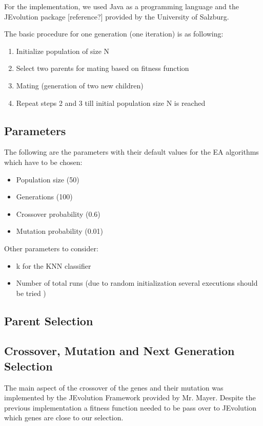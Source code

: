 \documentclass[11pt,onecolumn,a4paper]{report}
\begin{document}
For the implementation, we used Java as a programming language and the JEvolution package [reference?] provided by the University of Salzburg.

The basic procedure for one generation (one iteration) is as following:

\begin{enumerate}
\item {Initialize population of size N}
\item {Select two parents for mating based on fitness function}
\item {Mating (generation of two new children)}
\item{Repeat steps 2 and 3 till initial population size N is reached}
\end{enumerate}   

\subsection{Parameters}

The following are the parameters with their default values for the EA algorithms which have to be chosen:

\begin{itemize}
\item {Population size (50)}
\item {Generations (100)}
\item {Crossover probability (0.6)}
\item{Mutation probability (0.01)}
\end{itemize}

Other parameters to consider:

\begin{itemize}
\item {k for the KNN classifier}
\item {Number of total runs (due to random initialization several executions should be tried )}
\end{itemize}



\subsection {Parent Selection}
\label{sec:eval}

\subsection{Crossover, Mutation and Next Generation Selection}
\label{sec:eval}
The main aspect of the crossover of the genes and their mutation was implemented by the JEvolution Framework provided by Mr. Mayer. Despite the previous implementation a fitness function needed to be pass over to JEvolution which genes are close to our selection.
\end{document}
